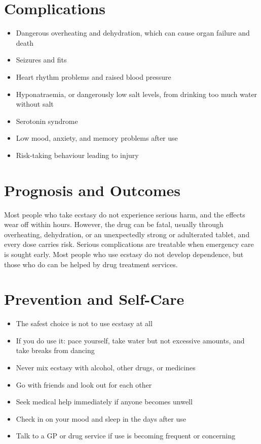 \section*{Complications}
\begin{itemize}
    \item Dangerous overheating and dehydration, which can cause organ failure and death
    \item Seizures and fits
    \item Heart rhythm problems and raised blood pressure
    \item Hyponatraemia, or dangerously low salt levels, from drinking too much water without salt
    \item Serotonin syndrome
    \item Low mood, anxiety, and memory problems after use
    \item Risk-taking behaviour leading to injury
\end{itemize}

\section*{Prognosis and Outcomes}
Most people who take ecstasy do not experience serious harm, and the effects wear off within hours. However, the drug can be fatal, usually through overheating, dehydration, or an unexpectedly strong or adulterated tablet, and every dose carries risk. Serious complications are treatable when emergency care is sought early. Most people who use ecstasy do not develop dependence, but those who do can be helped by drug treatment services.

\section*{Prevention and Self-Care}
\begin{itemize}
    \item The safest choice is not to use ecstasy at all
    \item If you do use it: pace yourself, take water but not excessive amounts, and take breaks from dancing
    \item Never mix ecstasy with alcohol, other drugs, or medicines
    \item Go with friends and look out for each other
    \item Seek medical help immediately if anyone becomes unwell
    \item Check in on your mood and sleep in the days after use
    \item Talk to a GP or drug service if use is becoming frequent or concerning
\end{itemize}

